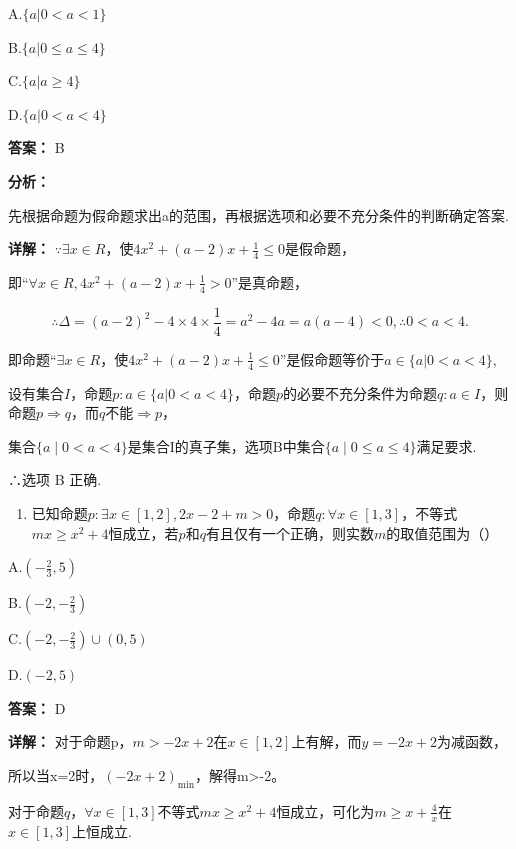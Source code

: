 \documentclass[11pt,a4paper]{ctexart}
\begin{document}
A.\(\{a|0 < a < 1\}\)

B.\(\{a|0\leq a\leq 4\}\)

C.\(\{a|a\geq 4\}\)

D.\(\{a|0 < a < 4\}\)

\textbf{答案：}
B

\textbf{分析：}

先根据命题为假命题求出a的范围，再根据选项和必要不充分条件的判断确定答案.

\textbf{详解：}
\(\because \exists x \in R\)，使\(4x^{2} + (a - 2)x + \frac{1}{4} \leq 0\)是假命题，

即``\(\forall x \in R, 4x^{2} + (a - 2)x + \frac{1}{4} > 0\)''是真命题，

\[
\therefore \Delta = (a - 2) ^ {2} - 4 \times 4 \times \frac {1}{4} = a ^ {2} - 4 a = a (a - 4) <   0, \therefore 0 <   a <   4.
\]

即命题``\(\exists x \in R\)，使\(4x^{2} + (a - 2)x + \frac{1}{4} \leq 0\)''是假命题等价于\(a \in \{a | 0 < a < 4\}\),

设有集合\(I\)，命题\(p: a \in \{a | 0 < a < 4\}\)，命题\(p\)的必要不充分条件为命题\(q: a \in I\)，则命题\(p \Rightarrow q\)，而\(q\)不能\(\Rightarrow p\)，

集合\(\{a\mid0<a<4\}\)是集合I的真子集，选项B中集合\(\{a\mid0\leq a\leq4\}\)满足要求.

∴选项 B 正确.

\begin{enumerate}[label=\arabic*., leftmargin=*, start=6]
\item 已知命题\(p: \exists x \in [1,2], 2x - 2 + m > 0\)，命题\(q: \forall x \in [1,3]\)，不等式\(mx \geq x^2 + 4\)恒成立，若\(p\)和\(q\)有且仅有一个正确，则实数\(m\)的取值范围为（）
\end{enumerate}

A.\(\left(-\frac{2}{3},5\right)\)

B.\(\left(-2,-\frac{2}{3}\right)\)

C.\(\left(-2,-\frac{2}{3}\right)\cup(0,5)\)

D.\((-2,5)\)

\textbf{答案：}
D

\textbf{详解：}
对于命题p，\(m > -2x + 2\)在\(x \in [1,2]\)上有解，而\(y = -2x + 2\)为减函数，

所以当x=2时，\((-2x+2)_{\min}\)，解得m\textgreater-2。

对于命题\(q\)，\(\forall x \in [1,3]\)不等式\(mx \geq x^2 + 4\)恒成立，可化为\(m \geq x + \frac{4}{x}\)在\(x \in [1,3]\)上恒成立.
\end{document}
